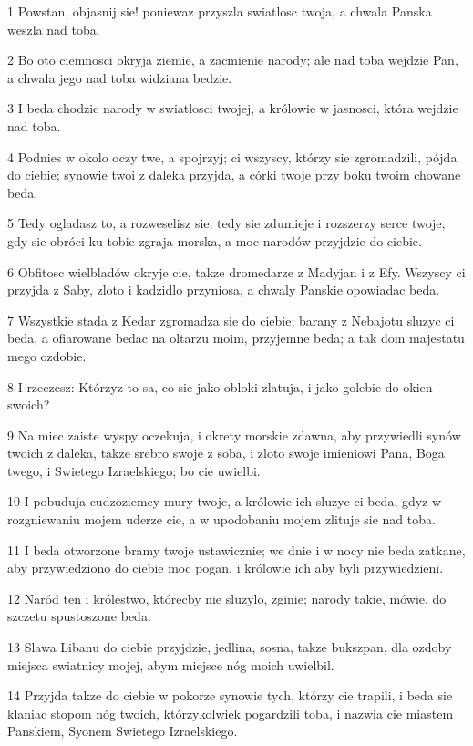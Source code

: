 \par 1 Powstan, objasnij sie! poniewaz przyszla swiatlosc twoja, a chwala Panska weszla nad toba.
\par 2 Bo oto ciemnosci okryja ziemie, a zacmienie narody; ale nad toba wejdzie Pan, a chwala jego nad toba widziana bedzie.
\par 3 I beda chodzic narody w swiatlosci twojej, a królowie w jasnosci, która wejdzie nad toba.
\par 4 Podnies w okolo oczy twe, a spojrzyj; ci wszyscy, którzy sie zgromadzili, pójda do ciebie; synowie twoi z daleka przyjda, a córki twoje przy boku twoim chowane beda.
\par 5 Tedy ogladasz to, a rozweselisz sie; tedy sie zdumieje i rozszerzy serce twoje, gdy sie obróci ku tobie zgraja morska, a moc narodów przyjdzie do ciebie.
\par 6 Obfitosc wielbladów okryje cie, takze dromedarze z Madyjan i z Efy. Wszyscy ci przyjda z Saby, zloto i kadzidlo przyniosa, a chwaly Panskie opowiadac beda.
\par 7 Wszystkie stada z Kedar zgromadza sie do ciebie; barany z Nebajotu sluzyc ci beda, a ofiarowane bedac na oltarzu moim, przyjemne beda; a tak dom majestatu mego ozdobie.
\par 8 I rzeczesz: Którzyz to sa, co sie jako obloki zlatuja, i jako golebie do okien swoich?
\par 9 Na miec zaiste wyspy oczekuja, i okrety morskie zdawna, aby przywiedli synów twoich z daleka, takze srebro swoje z soba, i zloto swoje imieniowi Pana, Boga twego, i Swietego Izraelskiego; bo cie uwielbi.
\par 10 I pobuduja cudzoziemcy mury twoje, a królowie ich sluzyc ci beda, gdyz w rozgniewaniu mojem uderze cie, a w upodobaniu mojem zlituje sie nad toba.
\par 11 I beda otworzone bramy twoje ustawicznie; we dnie i w nocy nie beda zatkane, aby przywiedziono do ciebie moc pogan, i królowie ich aby byli przywiedzieni.
\par 12 Naród ten i królestwo, którecby nie sluzylo, zginie; narody takie, mówie, do szczetu spustoszone beda.
\par 13 Slawa Libanu do ciebie przyjdzie, jedlina, sosna, takze bukszpan, dla ozdoby miejsca swiatnicy mojej, abym miejsce nóg moich uwielbil.
\par 14 Przyjda takze do ciebie w pokorze synowie tych, którzy cie trapili, i beda sie klaniac stopom nóg twoich, którzykolwiek pogardzili toba, i nazwia cie miastem Panskiem, Syonem Swietego Izraelskiego.
